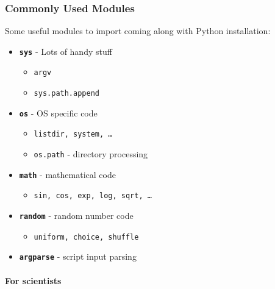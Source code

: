\documentclass{article}
\begin{document}
    \subsubsection{Commonly Used Modules}\label{commonly-used-modules}

Some useful modules to import coming along with Python installation:

\begin{itemize}
\item
  \textbf{\texttt{sys}} - Lots of handy stuff

  \begin{itemize}
  \item
    \texttt{argv}
  \item
    \texttt{sys.path.append}
  \end{itemize}
\item
  \textbf{\texttt{os}} - OS specific code

  \begin{itemize}
  \item
    \texttt{listdir, system, \ldots{}}
  \item
    \texttt{os.path} - directory processing
  \end{itemize}
\item
  \textbf{\texttt{math}} - mathematical code

  \begin{itemize}
  \itemsep1pt\parskip0pt
  \item
    \texttt{sin, cos, exp, log, sqrt, \ldots{}}
  \end{itemize}
\item
  \textbf{\texttt{random}} - random number code

  \begin{itemize}
  \itemsep1pt\parskip0pt
  \item
    \texttt{uniform, choice, shuffle}
  \end{itemize}
\item
  \textbf{\texttt{argparse}} - script input parsing
\end{itemize}

    \paragraph{For scientists}\label{for-scientists}
\end{document}
